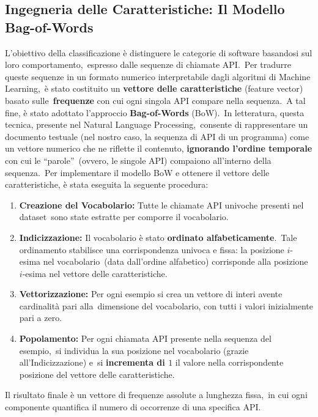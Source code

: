 \subsection{Ingegneria delle Caratteristiche: Il Modello Bag-of-Words}

L'obiettivo della classificazione è distinguere le categorie di software basandosi sul loro comportamento,\
espresso dalle sequenze di chiamate API.\
Per tradurre queste sequenze in un formato numerico interpretabile dagli algoritmi di Machine Learning,\
è stato costituito un \textbf{vettore delle caratteristiche} (feature vector) basato sulle\
\textbf{frequenze} con cui ogni singola API compare nella sequenza.\
A tal fine, è stato adottato l'approccio \textbf{Bag-of-Words} (BoW).\
In letteratura, questa tecnica, presente nel Natural Language Processing,\
consente di rappresentare un documento testuale (nel nostro caso, la sequenza di API di un programma)
come un vettore numerico che ne riflette il contenuto, \textbf{ignorando l'ordine temporale} con cui le ``parole''\
(ovvero, le singole API) compaiono all'interno della sequenza.\
Per implementare il modello BoW e ottenere il vettore delle caratteristiche, è stata eseguita la seguente procedura:

\begin{enumerate}
    \item \textbf{Creazione del Vocabolario:} Tutte le chiamate API univoche presenti nel dataset\
          sono state estratte per comporre il vocabolario.
    \item \textbf{Indicizzazione:} Il vocabolario è stato \textbf{ordinato alfabeticamente}.\
          Tale ordinamento stabilisce una corrispondenza univoca e fissa: la posizione $i$-esima nel vocabolario\
          (data dall'ordine alfabetico) corrisponde alla posizione $i$-esima nel vettore delle caratteristiche.
    \item \textbf{Vettorizzazione:} Per ogni esempio si crea un vettore di interi avente cardinalità pari alla\
          dimensione del vocabolario, con tutti i valori inizialmente pari a zero.
    \item \textbf{Popolamento:} Per ogni chiamata API presente nella sequenza del esempio,\
          si individua la sua posizione nel vocabolario (grazie all'Indicizzazione) e\
          si \textbf{incrementa di $1$} il valore nella corrispondente posizione del vettore delle caratteristiche.
\end{enumerate}

Il risultato finale è un vettore di frequenze assolute a lunghezza fissa,\
in cui ogni componente quantifica il numero di occorrenze di una specifica API.

